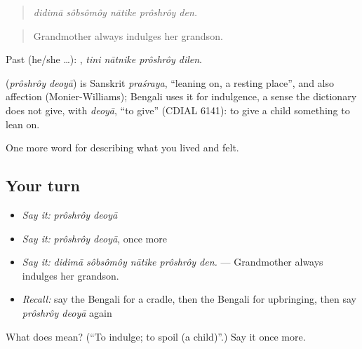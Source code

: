 \begin{quote}
    
\end{quote}

\begin{quote}
\emph{didimā sôbsômôy nātike prôshrôy den.}
\end{quote}

\begin{quote}
Grandmother always indulges her grandson.
\end{quote}

Past (he/she …):    , \emph{tini nātnike prôshrôy dilen}.

\begin{cousinweb}
\textbf{ } (\emph{prôshrôy deoyā}) is Sanskrit \emph{praśraya}, \textquotedblleft{}leaning on, a resting place\textquotedblright{}, and also affection (Monier-Williams); Bengali uses it for indulgence, a sense the dictionary does not give, with \emph{deoyā}, \textquotedblleft{}to give\textquotedblright{} (CDIAL 6141): to give a child something to lean on.
\end{cousinweb}

\begin{grammarlens}[title={What you've built}]
One more word for describing what you lived and felt.
\end{grammarlens}

\subsection*{Your turn}
\begin{itemize}
\raggedright
  \item \emph{Say it:} \emph{prôshrôy deoyā}
  \item \emph{Say it:} \emph{prôshrôy deoyā}, once more
  \item \emph{Say it:} \emph{didimā sôbsômôy nātike prôshrôy den.} — Grandmother always indulges her grandson.
  \item \emph{Recall:} say the Bengali for a cradle, then the Bengali for upbringing, then say \emph{prôshrôy deoyā} again
\end{itemize}

\begin{tcolorbox}[breakable,colback=teal!4,colframe=teal!35!black,title={Before you move on}]
What does   mean? (\textquotedblleft{}To indulge; to spoil (a child)\textquotedblright{}.) Say it once more.
\end{tcolorbox}
